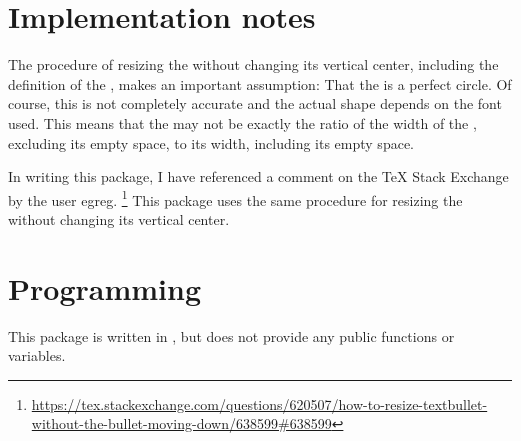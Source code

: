\documentclass{beery}
\begin{document}
\section{Implementation notes}
\label{sec:implementation}

The procedure of resizing the  without changing its vertical center, including the definition of the \textbulletfactor{}, makes an important assumption:
That the  is a perfect circle.
Of course, this is not completely accurate and the actual shape depends on the font used.
This means that the \textbulletfactor{} may not be exactly the ratio of the width of the , excluding its empty space, to its width, including its empty space.

In writing this package, I have referenced a comment on the \TeX{} Stack Exchange by the user egreg.%
\footnote{\url{https://tex.stackexchange.com/questions/620507/how-to-resize-textbullet-without-the-bullet-moving-down/638599\#638599}}
This package uses the same procedure for resizing the  without changing its vertical center.


\section{Programming}
\label{sec:programming}

This package is written in , but does not provide any public functions or variables.
\end{document}
